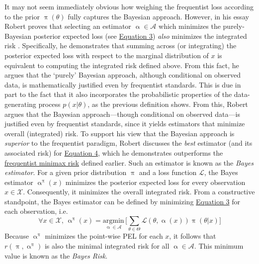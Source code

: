 \documentclass[letterpaper,12pt]{article}
\newcommand{\given}{|}
\begin{document}
It may not seem immediately obvious how weighing the frequentist loss according to the prior $\uppi(\theta)$ fully captures the Bayesian approach. However, in his essay Robert proves that selecting an estimator $\upalpha \in \mathcal{A}$ which minimizes the purely-Bayesian posterior expected loss (see \hyperref[eq:PEL]{Equation 3}) \textit{also} minimizes the integrated risk \cite{robert2007bayesian}. Specifically, he demonstrates that summing across (or integrating) the posterior expected loss with respect to the marginal distribution of $x$ is equivalent to computing the integrated risk defined above. From this fact, he argues that the `purely' Bayesian approach, although conditional on observed data, is mathematically justified even by frequentist standards. This is due in part to the fact that it also incorporates the probabilistic properties of the data-generating process $p(x \given \theta)$, as the previous definition shows. From this, Robert argues that the Bayesian approach—though conditional on observed data—is justified even by frequentist standards, since it yields estimators that minimize overall (integrated) risk. To support his view that the Bayesian approach is \textit{superior} to the frequentist paradigm, Robert discusses the \textit{best} estimator (and its associated risk) for \hyperref[eq:IR]{Equation 4}, which he demonstrates outperforms the \hyperref[eq:minimaxrisk]{frequentist minimax risk} defined earlier. Such an estimator is known as the \textit{Bayes estimator}. For a given prior distribution $\uppi$ and a loss function $\mathcal{L}$, the Bayes estimator $\upalpha^{\uppi}(x)$ minimizes the posterior expected loss for every observation $x \in \mathcal{X}$. Consequently, it minimizes the overall integrated risk. From a constructive standpoint, the Bayes estimator can be defined by minimizing \hyperref[eq:PEL]{Equation 3} for each observation, i.e.
$$
\forall x \in \mathcal{X}, \,\upalpha^{\uppi}(x) = \underset{\upalpha \in \mathcal{A}}{\text{argmin}} \, \bigg[\sum_{\theta \in \Theta} \mathcal{L}(\theta, \upalpha(x)) \uppi(\theta \given x)\bigg]
$$
Because $\upalpha^{\uppi}$ minimizes the point-wise PEL for each $x$, it follows that $r(\uppi, \upalpha^{\uppi})$ is also the minimal integrated risk for all $\upalpha \in \mathcal{A}$. This minimum value is known as the \textit{Bayes Risk}. 
\end{document}
